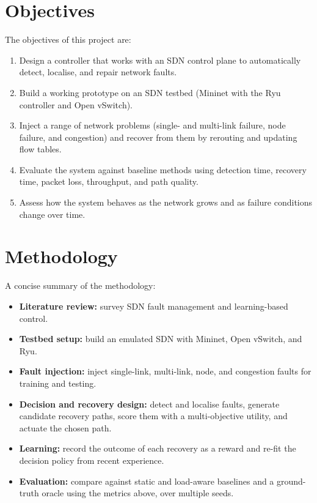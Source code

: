 \documentclass[12pt,a4paper]{report}
\begin{document}
\section{Objectives}
The objectives of this project are:
\begin{enumerate}
\item Design a controller that works with an SDN control plane to automatically detect,
localise, and repair network faults.
\item Build a working prototype on an SDN testbed (Mininet with the Ryu controller and Open
vSwitch).
\item Inject a range of network problems (single- and multi-link failure, node failure, and
congestion) and recover from them by rerouting and updating flow tables.
\item Evaluate the system against baseline methods using detection time, recovery time,
packet loss, throughput, and path quality.
\item Assess how the system behaves as the network grows and as failure conditions change
over time.
\end{enumerate}

\section{Methodology}
A concise summary of the methodology:
\begin{itemize}
\item \textbf{Literature review:} survey SDN fault management and learning-based control.
\item \textbf{Testbed setup:} build an emulated SDN with Mininet, Open vSwitch, and Ryu.
\item \textbf{Fault injection:} inject single-link, multi-link, node, and congestion faults
for training and testing.
\item \textbf{Decision and recovery design:} detect and localise faults, generate candidate
recovery paths, score them with a multi-objective utility, and actuate the chosen path.
\item \textbf{Learning:} record the outcome of each recovery as a reward and re-fit the
decision policy from recent experience.
\item \textbf{Evaluation:} compare against static and load-aware baselines and a
ground-truth oracle using the metrics above, over multiple seeds.
\end{itemize}
\end{document}
